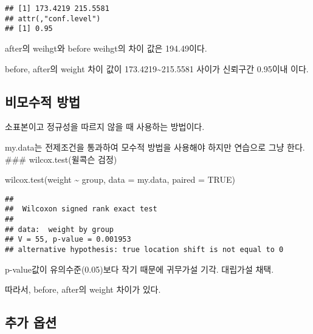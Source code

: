 \documentclass[
]{article}
\newenvironment{Shaded}{\begin{snugshade}}{\end{snugshade}}
\newcommand{\AttributeTok}[1]{\textcolor[rgb]{0.77,0.63,0.00}{#1}}
\newcommand{\ConstantTok}[1]{\textcolor[rgb]{0.00,0.00,0.00}{#1}}
\newcommand{\FunctionTok}[1]{\textcolor[rgb]{0.00,0.00,0.00}{#1}}
\newcommand{\NormalTok}[1]{#1}
\newcommand{\SpecialCharTok}[1]{\textcolor[rgb]{0.00,0.00,0.00}{#1}}
\begin{document}
\begin{verbatim}
## [1] 173.4219 215.5581
## attr(,"conf.level")
## [1] 0.95
\end{verbatim}

after의 weihgt와 before weihgt의 차이 값은 194.49이다.

before, after의 weight 차이 값이 173.4219\textasciitilde215.5581 사이가 신뢰구간 0.95이내 이다.

\hypertarget{uxbe44uxbaa8uxc218uxc801-uxbc29uxbc95-1}{%
\subsection{비모수적 방법}\label{uxbe44uxbaa8uxc218uxc801-uxbc29uxbc95-1}}

소표본이고 정규성을 따르지 않을 때 사용하는 방법이다.

my.data는 전제조건을 통과하여 모수적 방법을 사용해야 하지만 연습으로 그냥 한다.
\#\#\# wilcox.test(윌콕슨 검정)

\begin{Shaded}
\begin{Highlighting}[]
\FunctionTok{wilcox.test}\NormalTok{(weight }\SpecialCharTok{\textasciitilde{}}\NormalTok{ group, }\AttributeTok{data =}\NormalTok{ my.data, }\AttributeTok{paired =} \ConstantTok{TRUE}\NormalTok{)}
\end{Highlighting}
\end{Shaded}

\begin{verbatim}
## 
##  Wilcoxon signed rank exact test
## 
## data:  weight by group
## V = 55, p-value = 0.001953
## alternative hypothesis: true location shift is not equal to 0
\end{verbatim}

p-value값이 유의수준(0.05)보다 작기 때문에 귀무가설 기각. 대립가설 채택.

따라서, before, after의 weight 차이가 있다.

\hypertarget{uxcd94uxac00-uxc635uxc158}{%
\subsection{추가 옵션}\label{uxcd94uxac00-uxc635uxc158}}

\begin{Shaded}
\end{Shaded}
\end{document}
